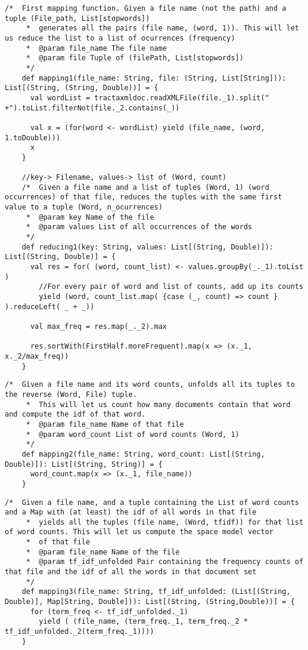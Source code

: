 \documentclass{report}
\begin{document}
\begin{lstlisting}[style=scalaHighlight]
    /*  First mapping function. Given a file name (not the path) and a tuple (File_path, List[stopwords])
     *  generates all the pairs (file name, (word, 1)). This will let us reduce the list to a list of ocurrences (frequency)
     *  @param file_name The file name
     *  @param file Tuple of (filePath, List[stopwords])
     */
    def mapping1(file_name: String, file: (String, List[String])): List[(String, (String, Double))] = {
      val wordList = tractaxmldoc.readXMLFile(file._1).split(" +").toList.filterNot(file._2.contains(_))

      val x = (for(word <- wordList) yield (file_name, (word, 1.toDouble)))
      x
    }

    //key-> Filename, values-> list of (Word, count)
    /*  Given a file name and a list of tuples (Word, 1) (word occurrences) of that file, reduces the tuples with the same first value to a tuple (Word, n_ocurrences)
     *  @param key Name of the file
     *  @param values List of all occurrences of the words
     */
    def reducing1(key: String, values: List[(String, Double)]): List[(String, Double)] = {
      val res = for( (word, count_list) <- values.groupBy(_._1).toList )
        //For every pair of word and list of counts, add up its counts
        yield (word, count_list.map( {case (_, count) => count } ).reduceLeft( _ + _))

      val max_freq = res.map(_._2).max

      res.sortWith(FirstHalf.moreFrequent).map(x => (x._1, x._2/max_freq))
    }

\end{lstlisting}

\begin{lstlisting}[style=scalaHighlight]
    /*  Given a file name and its word counts, unfolds all its tuples to the reverse (Word, File) tuple.
     *  This will let us count how many documents contain that word and compute the idf of that word.
     *  @param file_name Name of that file
     *  @param word_count List of word counts (Word, 1)
     */
    def mapping2(file_name: String, word_count: List[(String, Double)]): List[(String, String)] = {
      word_count.map(x => (x._1, file_name))
    }
\end{lstlisting}

\begin{lstlisting}[style=scalaHighlight]
/*  Given a file name, and a tuple containing the List of word counts and a Map with (at least) the idf of all words in that file
     *  yields all the tuples (file name, (Word, tfidf)) for that list of word counts. This will let us compute the space model vector
     *  of that file
     *  @param file_name Name of the file
     *  @param tf_idf_unfolded Pair containing the frequency counts of that file and the idf of all the words in that document set
     */
    def mapping3(file_name: String, tf_idf_unfolded: (List[(String, Double)], Map[String, Double])): List[(String, (String,Double))] = {
      for (term_freq <- tf_idf_unfolded._1)
        yield ( (file_name, (term_freq._1, term_freq._2 * tf_idf_unfolded._2(term_freq._1))))
    }
\end{lstlisting}
\end{document}
